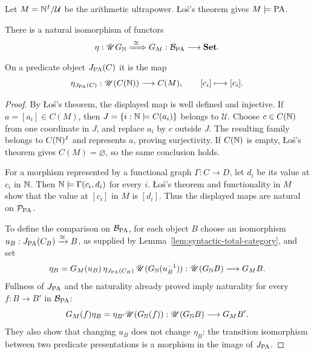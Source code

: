 Let $M=\mathbb N^I/\mathcal U$ be the arithmetic ultrapower.
\L o\'s's theorem gives $M\models\mathrm{PA}$.

\begin{lemma}
\label{lem:ultrapower-comparison}
There is a natural isomorphism of functors
\[
 \eta:\mathscr U G_{\mathbb N}\xRightarrow{\ \cong\ }G_M:
             \mathcal B_{\mathrm{PA}}\longrightarrow\mathbf{Set}.
\]
On a predicate object $J_{\mathrm{PA}}(C)$ it is the map
\begin{equation}\label{eq:ultrapower-predicate-comparison}
 \eta_{J_{\mathrm{PA}}(C)}:
 \mathscr U(C(\mathbb N))\longrightarrow C(M),
 \qquad [c_i]\longmapsto[c_i].
\end{equation}
\end{lemma}
\begin{proof}
By \L o\'s's theorem, the displayed map is well defined and
injective. If $a=[a_i]\in C(M)$, then
$J=\{i:\mathbb N\models C(a_i)\}$ belongs to $\mathcal U$.
Choose $c\in C(\mathbb N)$ from one coordinate in $J$, and replace
$a_i$ by $c$ outside $J$. The resulting family belongs to
$C(\mathbb N)^I$ and represents $a$, proving surjectivity. If
$C(\mathbb N)$ is empty, \L o\'s's theorem gives $C(M)=\varnothing$,
so the same conclusion holds.

For a morphism represented by a functional graph
$\Gamma:C\to D$, let $d_i$ be its value at $c_i$ in $\mathbb N$.
Then $\mathbb N\models\Gamma(c_i,d_i)$ for every $i$.
\L o\'s's theorem and functionality in $M$ show that the value
at $[c_i]$ in $M$ is $[d_i]$. Thus the displayed maps are
natural on $\mathcal P_{\mathrm{PA}}$.

To define the comparison on $\mathcal B_{\mathrm{PA}}$, for each
object $B$ choose an isomorphism
$u_B:J_{\mathrm{PA}}(C_B)\xrightarrow{\cong}B$, as supplied by
Lemma~\ref{lem:syntactic-total-category}, and set
\[
 \eta_B=G_M(u_B)\,
       \eta_{J_{\mathrm{PA}}(C_B)}\,
       \mathscr U(G_{\mathbb N}(u_B^{-1})):
       \mathscr U(G_{\mathbb N}B)\longrightarrow G_MB.
\]
Fullness of $J_{\mathrm{PA}}$ and the naturality already proved imply
naturality for every $f:B\to B'$ in $\mathcal B_{\mathrm{PA}}$:
\[
 G_M(f)\eta_B=\eta_{B'}\mathscr U(G_{\mathbb N}(f)):
       \mathscr U(G_{\mathbb N}B)\longrightarrow G_MB'.
\]
They also show that changing $u_B$ does not change $\eta_B$: the
transition
isomorphism between two predicate presentations is a morphism in
the image of $J_{\mathrm{PA}}$.
\end{proof}

